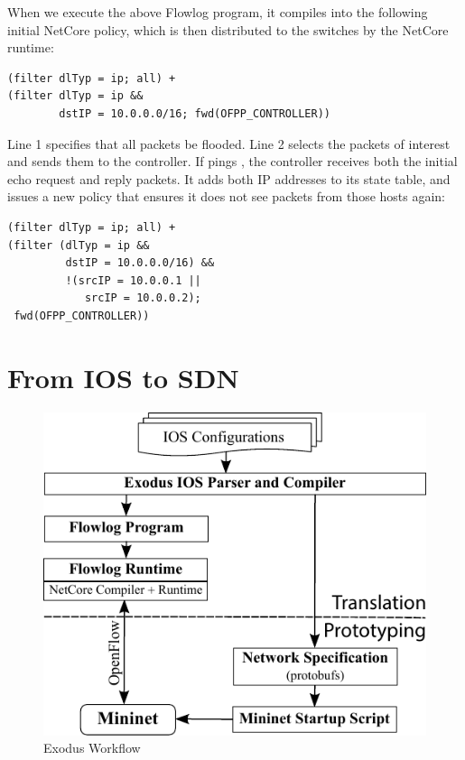 

When we execute the above Flowlog program, it compiles into the following
initial NetCore policy, which is then distributed to the switches by the NetCore runtime:
\begin{lstlisting}[label=lst:flowlog-netcore-1,language=Flowlog]
(filter dlTyp = ip; all) +
(filter dlTyp = ip &&
        dstIP = 10.0.0.0/16; fwd(OFPP_CONTROLLER))
\end{lstlisting} 
Line 1 specifies that all  packets be flooded. Line 2 selects the packets
of interest and sends them to the controller.
If  pings , the controller receives
both the initial echo request and reply packets. It adds both IP addresses to its state
table, and issues a new policy that ensures it does not see packets from those
hosts again:
\begin{lstlisting}[label=lst:flowlog-netcore-2,language=Flowlog]
(filter dlTyp = ip; all) +
(filter (dlTyp = ip && 
         dstIP = 10.0.0.0/16) &&
         !(srcIP = 10.0.0.1 ||
            srcIP = 10.0.0.2);
 fwd(OFPP_CONTROLLER))
\end{lstlisting}

\chapter{From IOS to SDN}
\label{sec:translating}

\begin{figure}
  \centering
  \includegraphics[scale=0.9]{figs/workflow.pdf}
  \vspace{0.2cm}
  \caption{Exodus Workflow}
  \label{fig:workflow}
\end{figure}

